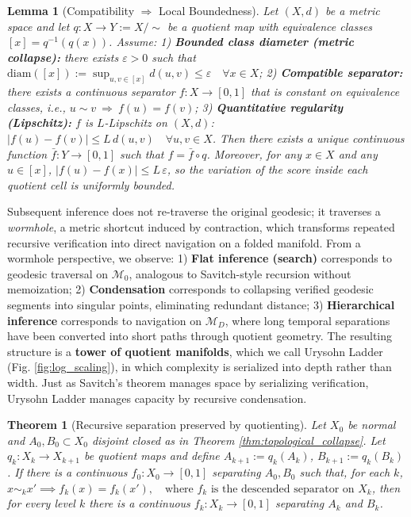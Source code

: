 \documentclass{article}
\newtheorem{theorem}{Theorem}
\newtheorem{lemma}{Lemma}
\begin{document}
\begin{lemma}[Compatibility $\Rightarrow$ Local Boundedness]
\label{lem:compat_local_bound}
Let $(X,d)$ be a metric space and let $q:X\to Y:=X/{\sim}$ be a quotient map with equivalence classes
$[x]=q^{-1}(q(x))$. Assume:
1) \textbf{Bounded class diameter (metric collapse):} there exists $\varepsilon>0$ such that
$\mathrm{diam}([x]) := \sup_{u,v\in[x]} d(u,v) \le \varepsilon
\quad \forall x\in X$;
2) \textbf{Compatible separator:} there exists a continuous separator $f:X\to[0,1]$ that is constant on equivalence
classes, i.e.,
$u\sim v \ \Rightarrow\ f(u)=f(v)$;
3) \textbf{Quantitative regularity (Lipschitz):} $f$ is $L$-Lipschitz on $(X,d)$:
$|f(u)-f(v)| \le L\,d(u,v)\quad \forall u,v\in X$.
Then there exists a unique continuous function $\bar f:Y\to[0,1]$ such that $f=\bar f\circ q$.
Moreover, for any $x\in X$ and any $u\in[x]$,
$|f(u)-f(x)| \le L\,\varepsilon$,
so the variation of the score inside each quotient cell is uniformly bounded.
\end{lemma}

Subsequent inference does not re-traverse the original geodesic; it traverses a \emph{wormhole}, a metric shortcut induced by contraction, which transforms repeated recursive verification into direct navigation on a folded manifold.
From a wormhole perspective, we observe:
1) \textbf{Flat inference (search)} corresponds to geodesic traversal on $\mathcal{M}_0$, analogous to Savitch-style recursion without memoization;
2) \textbf{Condensation} corresponds to collapsing verified geodesic segments into singular points, eliminating redundant distance;
3) \textbf{Hierarchical inference} corresponds to navigation on $\mathcal{M}_D$, where long temporal separations have been converted into short paths through quotient geometry.
The resulting structure is a \textbf{tower of quotient manifolds}, which we call Urysohn Ladder (Fig. \ref{fig:log_scaling}), in which complexity is serialized into depth rather than width.
Just as Savitch’s theorem manages space by serializing verification, Urysohn Ladder manages capacity by recursive condensation.
 
\begin{theorem}[Recursive separation preserved by quotienting]
\label{thm:urysohn_quotient}
Let $X_0$ be normal and $A_0,B_0\subset X_0$ disjoint closed as in Theorem \ref{thm:topological_collapse}.
Let $q_k:X_k\to X_{k+1}$ be quotient maps and define $A_{k+1}:=q_k(A_k)$, $B_{k+1}:=q_k(B_k)$.
If there is a continuous $f_0:X_0\to[0,1]$ separating $A_0,B_0$ such that, for each $k$,
$x\sim_k x' \implies f_k(x)=f_k(x'),
\quad\text{where } f_k \text{ is the descended separator on } X_k$,
then for every level $k$ there is a continuous $f_k:X_k\to[0,1]$ separating $A_k$ and $B_k$.
\end{theorem}
 
\end{document}
